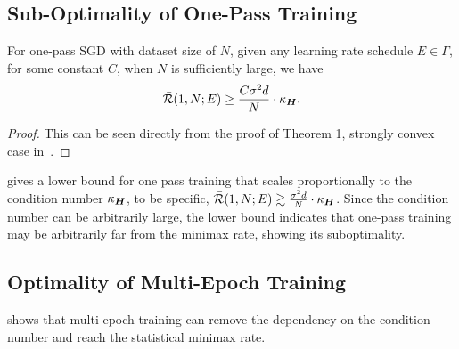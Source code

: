 \subsection{Sub-Optimality of One-Pass Training}

\begin{theorem} \label{thm:sub-optimality-one-pass}
    For one-pass SGD with dataset size of $N$, given any learning rate schedule $E\in \Gamma$, for some constant $C$, when $N$ is sufficiently large, we have 
    \begin{align*}
        \Bar{\mathcal{R}}(1,N;E) \geq \frac{C\sigma^2d }{N}\cdot\kappa_{{\bm{H}}}.
    \end{align*}
\end{theorem}

\begin{proof}
    This can be seen directly from the proof of Theorem 1, strongly convex case in~\citet{ge2019step}.
\end{proof}
 gives a lower bound for one pass training that scales proportionally to the condition number $\kappa_{{\bm{H}}}$, to be specific, $\Bar{\mathcal{R}}(1,N;E) \gtrsim \frac{\sigma^2 d}{N}\cdot \kappa_{{\bm{H}}}$. Since the condition number can be arbitrarily large, the lower bound indicates that one-pass training may be arbitrarily far from the minimax rate, showing its suboptimality. 

\subsection{Optimality of Multi-Epoch Training}

 shows that multi-epoch training can remove the dependency on the condition number and reach the statistical minimax rate.





